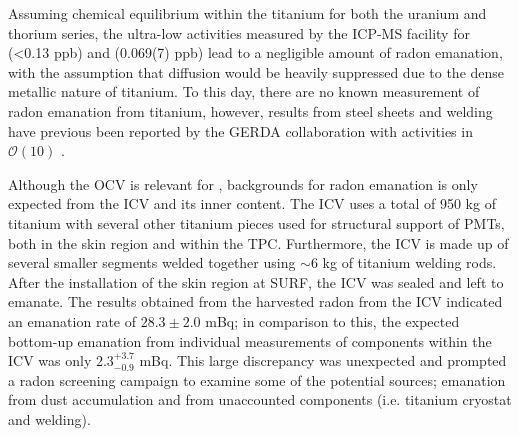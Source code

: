 Assuming chemical equilibrium within the titanium for both the uranium and thorium series, the ultra-low activities measured by the ICP-MS facility for \UTTEe{} (<0.13 ppb) and \ThTTTe{} (0.069(7) ppb) lead to a negligible amount of radon emanation, with the assumption that diffusion would be heavily suppressed due to the dense metallic nature of titanium. To this day, there are no known measurement of radon emanation from titanium, however, results from steel sheets and welding have previous been reported by the GERDA collaboration with activities in $\mathcal{O}(10)$ \uBqms \cite{osti_20719228, ZUZEL2009889}. 

Although the OCV is relevant for \grays, backgrounds for radon emanation is only expected from the ICV and its inner content. The ICV uses a total of 950 kg of titanium with several other titanium pieces used for structural support of PMTs, both in the skin region and within the TPC. Furthermore, the ICV is made up of several smaller segments welded together using $\sim$6 kg of titanium welding rods. After the installation of the skin region at SURF, the ICV was sealed and left to emanate. The results obtained from the harvested radon from the ICV indicated an emanation rate of $28.3\pm2.0$ mBq; in comparison to this, the expected bottom-up emanation from individual measurements of components within the ICV was only $2.3^{+3.7}_{-0.9}$ mBq. This large discrepancy was unexpected and prompted a radon screening campaign to examine some of the potential sources; emanation from dust accumulation and from unaccounted components (i.e. titanium cryostat and welding). 

